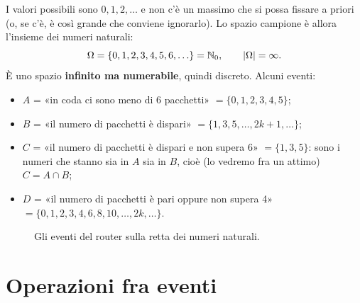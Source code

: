I valori possibili sono $0, 1, 2, \ldots$ e non c'è un massimo che si possa fissare a priori (o, se c'è, è così grande
che conviene ignorarlo). Lo spazio campione è allora l'insieme dei numeri naturali:
\[ \Omega = \{0, 1, 2, 3, 4, 5, 6, \ldots\} = \mathbb{N}_0, \qquad \left\lvert \Omega \right\rvert = \infty . \]
È uno spazio \textbf{infinito ma numerabile}, quindi discreto. Alcuni eventi:
\begin{itemize}
  \item $A$ = «in coda ci sono meno di 6 pacchetti» $= \{0, 1, 2, 3, 4, 5\}$;
  \item $B$ = «il numero di pacchetti è dispari» $= \{1, 3, 5, \ldots, 2k+1, \ldots\}$;
  \item $C$ = «il numero di pacchetti è dispari e non supera 6» $= \{1, 3, 5\}$: sono i numeri che stanno sia in $A$ sia
        in $B$, cioè (lo vedremo fra un attimo) $C = A \cap B$;
  \item $D$ = «il numero di pacchetti è pari oppure non supera 4» $= \{0, 1, 2, 3, 4, 6, 8, 10, \ldots, 2k, \ldots\}$.
\end{itemize}

\begin{figure}[H]
\centering
{}
\caption{Gli eventi del router sulla retta dei numeri naturali.}
\end{figure}

\section{Operazioni fra eventi}

